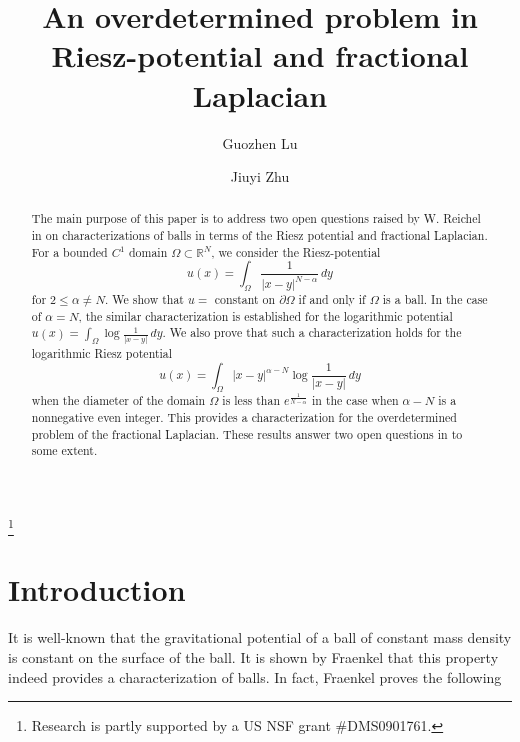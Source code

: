 \documentclass[12pt]{amsproc}
\theoremstyle{plain}
\numberwithin{equation}{section}
\begin{document}
\title[An overdetermined problem in Riesz-potential]{An overdetermined problem in Riesz-potential and fractional Laplacian}
\author{Guozhen Lu}
\author{Jiuyi Zhu}
\address{Guozhen Lu and Jiuyi Zhu\\
Department of Mathematics\\
Wayne State University\\
Detroit, MI 48202, USA\\
Emails: gzlu@math.wayne.edu and jiuyi.zhu@wayne.edu  }
\thanks{Research is partly supported by a US NSF grant \#DMS0901761.}
\date{}
  \dedicatory{ }

 \begin{abstract}
The main purpose of this paper is to address two open questions
raised by W. Reichel in \cite{R2} on characterizations of balls in
terms of the Riesz potential and fractional Laplacian. For a bounded
$C^1$ domain $\Omega\subset \mathbb R^N$, we consider the
Riesz-potential
$$u(x)=\int_{\Omega}\frac{1}{|x-y|^{N-\alpha}} \,dy$$ for $2\leq
\alpha \not =N$. We show that $u=$ constant on $\partial \Omega$ if
and only if $\Omega$ is a ball. In the case of $ \alpha=N$, the
similar characterization is established for the logarithmic
potential $u(x)=\int_\Omega \log{\frac{1}{|x-y|}} \,dy$. We also
prove that such a characterization holds for the logarithmic Riesz potential $$u(x)=\int_\Omega
|x-y|^{\alpha-N}\log\frac{1}{|x-y|} \,dy$$ when the diameter of the
domain $\Omega$ is less than $e^{\frac{1}{N-\alpha}}$ in the case
when $\alpha-N$ is a nonnegative even  integer. This provides a
characterization for the overdetermined problem of the fractional
Laplacian. These results  answer two open questions in \cite{R2} to
some extent.

\end{abstract}
\maketitle

\section{Introduction}

It is well-known that the gravitational potential of a ball of
constant mass density is constant on the surface of the ball.
 It is shown by Fraenkel \cite{Fr} that this property indeed provides a characterization of balls.
In fact, Fraenkel proves the following
\end{document}
